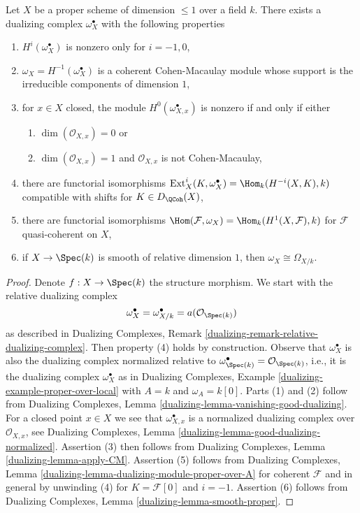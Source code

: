\begin{lemma}
\label{lemma-duality-dim-1}
Let $X$ be a proper scheme of dimension $\leq 1$ over a field $k$.
There exists a dualizing complex $\omega_X^\bullet$ with the
following properties
\begin{enumerate}
\item $H^i(\omega_X^\bullet)$ is nonzero only for $i = -1, 0$,
\item $\omega_X = H^{-1}(\omega_X^\bullet)$
is a coherent Cohen-Macaulay module whose support is the
irreducible components of dimension $1$,
\item for $x \in X$ closed, the module $H^0(\omega_{X, x}^\bullet)$
is nonzero if and only if either
\begin{enumerate}
\item $\dim(\mathcal{O}_{X, x}) = 0$ or
\item $\dim(\mathcal{O}_{X, x}) = 1$
and $\mathcal{O}_{X, x}$ is not Cohen-Macaulay,
\end{enumerate}
\item there are functorial isomorphisms
$\text{Ext}^i_X(K, \omega_X^\bullet) = \Hom_k(H^{-i}(X, K), k)$
compatible with shifts for $K \in D_\QCoh(X)$,
\item there are functorial isomorphisms
$\Hom(\mathcal{F}, \omega_X) = \Hom_k(H^1(X, \mathcal{F}), k)$
for $\mathcal{F}$ quasi-coherent on $X$,
\item if $X \to \Spec(k)$ is smooth of relative dimension $1$,
then $\omega_X \cong \Omega_{X/k}$.
\end{enumerate}
\end{lemma}

\begin{proof}
Denote $f : X \to \Spec(k)$ the structure morphism.
We start with the relative dualizing complex
$$
\omega_X^\bullet = \omega_{X/k}^\bullet = a(\mathcal{O}_{\Spec(k)})
$$
as described in Dualizing Complexes,
Remark \ref{dualizing-remark-relative-dualizing-complex}.
Then property (4) holds by construction.
Observe that $\omega_X^\bullet$ is also the dualizing complex
normalized relative to
$\omega_{\Spec(k)}^\bullet = \mathcal{O}_{\Spec(k)}$, i.e.,
it is the dualizing complex $\omega_X^\bullet$
as in Dualizing Complexes, Example \ref{dualizing-example-proper-over-local}
with $A = k$ and $\omega_A = k[0]$.
Parts (1) and (2) follow from
Dualizing Complexes, Lemma \ref{dualizing-lemma-vanishing-good-dualizing}.
For a closed point $x \in X$ we see that $\omega_{X, x}^\bullet$ is a
normalized dualizing complex over $\mathcal{O}_{X, x}$, see
Dualizing Complexes, Lemma \ref{dualizing-lemma-good-dualizing-normalized}.
Assertion (3) then follows from
Dualizing Complexes, Lemma \ref{dualizing-lemma-apply-CM}.
Assertion (5) follows from
Dualizing Complexes, Lemma \ref{dualizing-lemma-dualizing-module-proper-over-A}
for coherent $\mathcal{F}$ and in general by unwinding
(4) for $K = \mathcal{F}[0]$ and $i = -1$.
Assertion (6) follows from Dualizing Complexes,
Lemma \ref{dualizing-lemma-smooth-proper}.
\end{proof}

